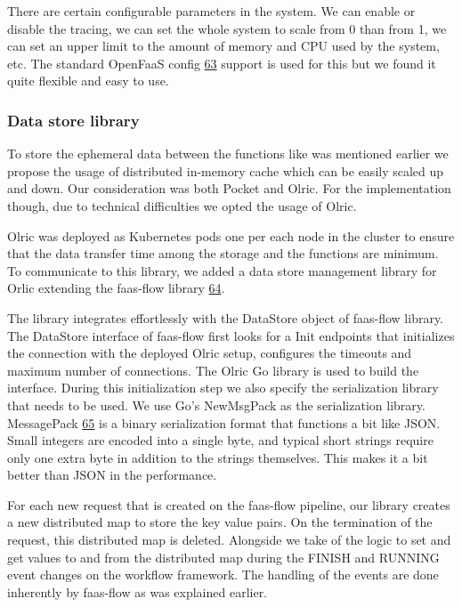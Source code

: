 \documentclass[12pt,titlepage]{article}
\begin{document}
There are certain configurable parameters in the system. We can enable or
disable the tracing, we can set the whole system to scale from 0 than from 1, we
can set an upper limit to the amount of memory and CPU used by the system, etc.
The standard OpenFaaS config \hyperref[ref:63]{63} support is used for this but we found it quite
flexible and easy to use.

\subsubsection{Data store library}
\label{sec:org7077b38}
To store the ephemeral data between the functions like was mentioned earlier we
propose the usage of distributed in-memory cache which can be easily scaled up
and down. Our consideration was both Pocket and Olric. For the implementation
though, due to technical difficulties we opted the usage of Olric.

Olric was deployed as Kubernetes pods one per each node in the cluster to ensure
that the data transfer time among the storage and the functions are minimum. To
communicate to this library, we added a data store management library for Orlic
extending the faas-flow library \hyperref[ref:64]{64}.

The library integrates effortlessly with the DataStore object of faas-flow
library. The DataStore interface of faas-flow first looks for a Init endpoints
that initializes the connection with the deployed Olric setup, configures the
timeouts and maximum number of connections. The Olric Go library is used to
build the interface. During this initialization step we also specify the
serialization library that needs to be used. We use Go's NewMsgPack as the
serialization library. MessagePack \hyperref[ref:65]{65} is a binary serialization format that
functions a bit like JSON. Small integers are encoded into a single byte, and
typical short strings require only one extra byte in addition to the strings
themselves. This makes it a bit better than JSON in the performance. 

For each new request that is created on the faas-flow pipeline, our library
creates a new distributed map to store the key value pairs. On the termination
of the request, this distributed map is deleted. Alongside we take of the logic
to set and get values to and from the distributed map during the FINISH and
RUNNING event changes on the workflow framework. The handling of the events are
done inherently by faas-flow as was explained earlier.  
\end{document}

